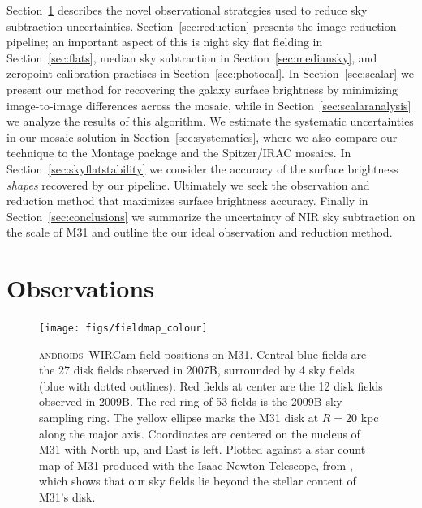 \documentclass[iop]{emulateapj}
\newcommand{\androids}{\textsc{androids}}
\begin{document}
Section~\ref{sec:Observations} describes the novel observational strategies used to reduce sky subtraction uncertainties.
Section~\ref{sec:reduction} presents the image reduction pipeline; an important aspect of this is night sky flat fielding in Section~\ref{sec:flats}, median sky subtraction in Section~\ref{sec:mediansky}, and zeropoint calibration practises in Section~\ref{sec:photocal}.
In Section~\ref{sec:scalar} we present our method for recovering the galaxy surface brightness by minimizing image-to-image differences across the mosaic, while in Section~\ref{sec:scalaranalysis} we analyze the results of this algorithm.
We estimate the systematic uncertainties in our mosaic solution in Section~\ref{sec:systematics}, where we also compare our technique to the Montage package \citep{Berriman:2008} and the Spitzer/IRAC mosaics.
In Section~\ref{sec:skyflatstability} we consider the accuracy of the surface brightness \emph{shapes} recovered by our pipeline.
Ultimately we seek the observation and reduction method that maximizes surface brightness accuracy.
Finally in Section~\ref{sec:conclusions} we summarize the uncertainty of NIR sky subtraction on the scale of M31 and outline the our ideal observation and reduction method.

\section{Observations}
\label{sec:Observations}

\begin{figure}[t]
\centering
\texttt{[image: figs/fieldmap\_colour]}
\caption{\androids\ WIRCam field positions on M31.
Central blue fields are the 27 disk fields observed in 2007B, surrounded by 4 sky fields (blue with dotted outlines).
Red fields at center are the 12 disk fields observed in 2009B.
The red ring of 53 fields is the 2009B sky sampling ring.
The yellow ellipse marks the M31 disk at $R=20$ kpc along the major axis.
Coordinates are centered on the nucleus of M31 with North up, and East is left.
Plotted against a star count map of M31 produced with the Isaac Newton Telescope, from \cite{Ibata:2005}, which shows that our sky fields lie beyond the stellar content of M31's disk.}
\label{fig:fieldmap}
\end{figure}

\end{document}
